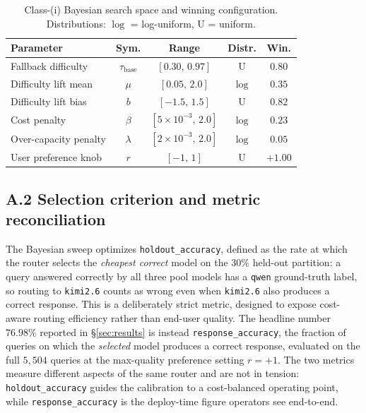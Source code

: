 \documentclass[twocolumn,10pt,a4paper]{article}
\begin{document}
\begin{table}[H]
\centering
\caption{Class-(i) Bayesian search space and winning configuration. Distributions: $\log$ = log-uniform, $\mathrm{U}$ = uniform.}
\label{tab:app_searchspace}
\small\setlength{\tabcolsep}{4pt}
\begin{tabular}{l c c c c}
\toprule
\textbf{Parameter} & Sym. & Range & Distr. & Win. \\
\midrule
Fallback difficulty       & $\tau_\text{base}$ & $[0.30,\,0.97]$ & $\mathrm{U}$  & $0.80$ \\
Difficulty lift mean      & $\mu$              & $[0.05,\,2.0]$  & $\log$        & $0.35$ \\
Difficulty lift bias      & $b$                & $[-1.5,\,1.5]$  & $\mathrm{U}$  & $0.82$ \\
Cost penalty              & $\beta$            & $[5{\times}10^{-3},\,2.0]$ & $\log$ & $0.23$ \\
Over-capacity penalty     & $\lambda$          & $[2{\times}10^{-3},\,2.0]$ & $\log$ & $0.05$ \\
User preference knob      & $r$                & $[-1,\,1]$      & $\mathrm{U}$  & $+1.00$ \\
\bottomrule
\end{tabular}
\end{table}

\subsection*{A.2 Selection criterion and metric reconciliation}
The Bayesian sweep optimizes \texttt{holdout\_accuracy}, defined as the rate at which the router selects the \emph{cheapest correct} model on the $30\%$ held-out partition: a query answered correctly by all three pool models has a \texttt{qwen} ground-truth label, so routing to \texttt{kimi2.6} counts as wrong even when \texttt{kimi2.6} also produces a correct response. This is a deliberately strict metric, designed to expose cost-aware routing efficiency rather than end-user quality. The headline number $76.98\%$ reported in §\ref{sec:results} is instead \texttt{response\_accuracy}, the fraction of queries on which the \emph{selected} model produces a correct response, evaluated on the full $5{,}504$ queries at the max-quality preference setting $r{=}{+}1$. The two metrics measure different aspects of the same router and are not in tension: \texttt{holdout\_accuracy} guides the calibration to a cost-balanced operating point, while \texttt{response\_accuracy} is the deploy-time figure operators see end-to-end.
\end{document}
